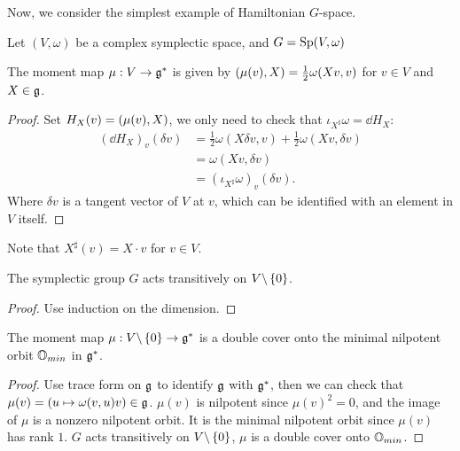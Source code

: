 Now, we consider the simplest example of Hamiltonian $G$-space.

Let $(V,\omega)$ be a complex symplectic space, and $G = \Sp(V,\omega)$

\begin{prop}
  The moment map $\mu : V \to \fg^*$ is given by $\bra{\mu(v),X} = \frac{1}{2}\omega(Xv,v)$ for $v \in V$ and $X \in \fg$.
\end{prop}

\begin{proof}
  Set $H_X(v) = \bra{\mu(v),X}$, we only need to check that $\iota_{X^{\sharp}} \omega = \dd H_X$:
  \begin{align*}
    (\dd H_X)_{v}(\delta v) &= \frac{1}{2} \omega(X \delta v, v) + \frac{1}{2} \omega(Xv, \delta v) \\
    &= \omega(Xv, \delta v) \\
    &= (\iota_{X^{\sharp}} \omega )_{v}(\delta v).
  \end{align*}
  Where $\delta v$ is a tangent vector of $V$ at $v$, which can be identified with an element in $V$ itself.
\end{proof}

\begin{rk}
  Note that $X^{\sharp}(v) = X \cdot v$ for $v \in V$.
\end{rk}

\begin{lem}
  The symplectic group $G$ acts transitively on $V \backslash \Bra{0}$.
\end{lem}

\begin{proof}
  Use induction on the dimension.
\end{proof}


\begin{prop}
  The moment map $\mu: V \backslash \Bra{0} \to \fg^*$ is a double cover onto the minimal nilpotent orbit $\BO_{min}$ in $\fg^*$.
\end{prop}

\begin{proof}
  Use trace form on $\fg$ to identify $\fg$ with $\fg^*$, then we can check that $\mu(v) = (u \mapsto \omega(v,u)v) \in \fg$.
  $\mu(v)$ is nilpotent since $\mu(v)^2 = 0$, and the image of $\mu$ is a nonzero nilpotent orbit. It is the minimal nilpotent orbit since $\mu(v)$ has rank $1$. $G$ acts transitively on $V \backslash \Bra{0}$, $\mu$ is a double cover onto $\BO_{min}$.
\end{proof}

